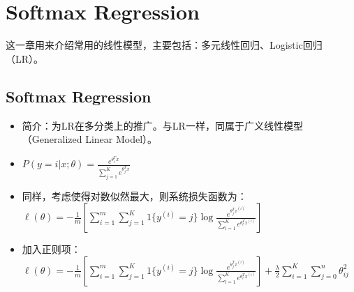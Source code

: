 \documentclass[10pt,a4paper]{ctexbook}
\begin{document}
\section{Softmax Regression}
这一章用来介绍常用的线性模型，主要包括：多元线性回归、Logistic回归（LR）。

\subsection{Softmax Regression}

\begin{itemize}
\item 简介：为LR在多分类上的推广。与LR一样，同属于广义线性模型（Generalized Linear Model）。
\item $P(y=i|x;{\theta})={\frac {e^{{\theta}_{i}^{T}x}}{\sum_{j=1}^{K}{e^{{\theta}_{j}^{T}x}}}}$
\item 同样，考虑使得对数似然最大，则系统损失函数为：\\
    $\ell(\theta)=-{\frac {1}{m}}\left[\sum\limits_{i=1}^{m}{\sum\limits_{j=1}^{K}{1\{y^{(i)}=j\}\log{\frac{e^{{\theta}_{j}^{T}{x^{(i)}}}}{\sum_{l=1}^{K}{e^{\theta_{l}^{T}x^{(i)}}}}}}}\right]$
\item 加入正则项：\\
    $\ell(\theta)=-{\frac {1}{m}}\left[\sum\limits_{i=1}^{m}{\sum\limits_{j=1}^{K}{1\{y^{(i)}=j\}\log{\frac{e^{{\theta}_{j}^{T}{x^{(i)}}}}{\sum_{l=1}^{K}{e^{\theta_{l}^{T}x^{(i)}}}}}}}\right]+
    {\frac {\lambda}{2}{\sum\limits_{i=1}^{K}{\sum\limits_{j=0}^{n}{\theta_{ij}^{2}}}}}$


\end{itemize}
\end{document}
